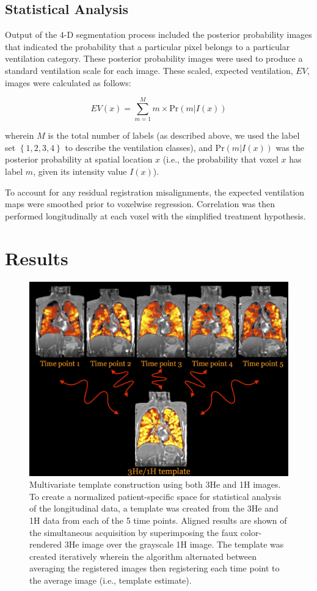 \documentclass[11pt,]{article}
\begin{document}
\subsection{Statistical Analysis}\label{statistical-analysis}

Output of the 4-D segmentation process included the posterior
probability images that indicated the probability that a particular
pixel belongs to a particular ventilation category. These posterior
probability images were used to produce a standard ventilation scale for
each image. These scaled, expected ventilation, \(EV\), images were
calculated as follows:

\[EV(x) = \sum_{m=1}^M m \times \mathrm{Pr}\left(m|I(x)\right)\]

wherein \(M\) is the total number of labels (as described above, we used
the label set \(\left\{1, 2, 3, 4\right\}\) to describe the ventilation
classes), and \(\mathrm{Pr}\left(m|I(x)\right)\) was the posterior
probability at spatial location \(x\) (i.e., the probability that voxel
\(x\) has label \(m\), given its intensity value \(I(x)\)).

To account for any residual registration misalignments, the expected
ventilation maps were smoothed prior to voxelwise regression.
Correlation was then performed longitudinally at each voxel with the
simplified treatment hypothesis.

\section{Results}\label{results}

\begin{figure}[htbp]
\centering
\includegraphics{Figures/H1He3Template.png}
\caption{Multivariate template construction using both 3He and 1H
images. To create a normalized patient-specific space for statistical
analysis of the longitudinal data, a template was created from the 3He
and 1H data from each of the 5 time points. Aligned results are shown of
the simultaneous acquisition by superimposing the faux color-rendered
3He image over the grayscale 1H image. The template was created
iteratively wherein the algorithm alternated between averaging the
registered images then registering each time point to the average image
(i.e., template estimate).}
\end{figure}
\end{document}
